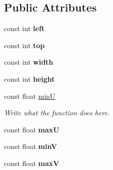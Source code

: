 \subsection*{Public Attributes}
\begin{DoxyCompactItemize}
\item 
\hypertarget{classTextureAtlas_a66451f0890d33e943f26b3d0ff073864}{const int {\bfseries left}}\label{classTextureAtlas_a66451f0890d33e943f26b3d0ff073864}

\item 
\hypertarget{classTextureAtlas_a75d33d1023c7a1d5bd9da3891018c8d4}{const int {\bfseries top}}\label{classTextureAtlas_a75d33d1023c7a1d5bd9da3891018c8d4}

\item 
\hypertarget{classTextureAtlas_a0bdebb01fa7731fb98420c024b6677e1}{const int {\bfseries width}}\label{classTextureAtlas_a0bdebb01fa7731fb98420c024b6677e1}

\item 
\hypertarget{classTextureAtlas_ab8a68953dfb57a24747bb4ec07a71d37}{const int {\bfseries height}}\label{classTextureAtlas_ab8a68953dfb57a24747bb4ec07a71d37}

\item 
const float \hyperlink{classTextureAtlas_a668da55e54ffc6ae084e3b67d39e1094}{min\+U}
\begin{DoxyCompactList}\small\item\em Write what the function does here. \end{DoxyCompactList}\item 
\hypertarget{classTextureAtlas_ab13e70b95c181acb72bbdbf89bb6126d}{const float {\bfseries max\+U}}\label{classTextureAtlas_ab13e70b95c181acb72bbdbf89bb6126d}

\item 
\hypertarget{classTextureAtlas_a55144ed06907322e6db2678d3cdf1911}{const float {\bfseries min\+V}}\label{classTextureAtlas_a55144ed06907322e6db2678d3cdf1911}

\item 
\hypertarget{classTextureAtlas_a0ca44f00d7d0a644a92a386d4db80504}{const float {\bfseries max\+V}}\label{classTextureAtlas_a0ca44f00d7d0a644a92a386d4db80504}

\end{DoxyCompactItemize}
